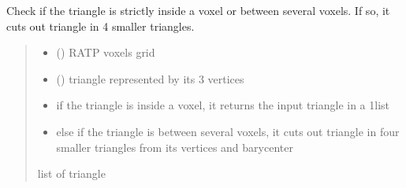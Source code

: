 \documentclass[letterpaper,10pt,english]{sphinxmanual}
\begin{document}
\begin{fulllineitems}
\label{\detokenize{reference:tesselator.tesselate}}
\pysigstartsignatures
{}
\pysigstopsignatures
\sphinxAtStartPar
Check if the triangle is strictly inside a voxel or between several voxels. If so, it cuts out
triangle in 4 smaller triangles.
\begin{quote}\begin{description}
\begin{itemize}
\item {} 
\sphinxAtStartPar
{} () \textendash{} RATP voxels grid

\item {} 
\sphinxAtStartPar
{} () \textendash{} triangle represented by its 3 vertices 

\end{itemize}

\sphinxAtStartPar
\begin{itemize}
\item {} 
\sphinxAtStartPar
if the triangle is inside a voxel, it returns the input triangle in a 1\sphinxhyphen{}list

\item {} 
\sphinxAtStartPar
else if the triangle is between several voxels, it cuts out triangle in four smaller triangles from its vertices and barycenter

\end{itemize}


\sphinxAtStartPar
list of triangle

\end{description}\end{quote}

\end{fulllineitems}

\end{document}
